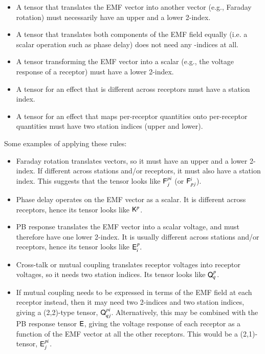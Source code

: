 \documentclass{aa}
\begin{document}
\begin{itemize}
\item A tensor that translates the EMF vector into another vector (e.g., Faraday rotation) must necessarily have an upper and a lower
2-index. 
\item A tensor that translates both components of the EMF field equally (i.e. a scalar operation such as phase delay) does not need any 
-indices at all.
\item A tensor transforming the EMF vector into a scalar (e.g., the voltage response of a receptor) must have a lower 2-index.
\item A tensor for an effect that is different across receptors must have a station index.
\item A tensor for an effect that maps per-receptor quantities onto per-receptor quantities must
have two station indices (upper and lower).
\end{itemize}

Some examples of applying these rules:

\begin{itemize}
\item Faraday rotation translates vectors, so it must have an upper and
a lower 2-index. If different across stations and/or receptors, it must also
have a station index. This suggests that the tensor looks like $\mathsf{F}_{j}^{pi}$ (or $\mathsf{F}_{pj}^{i}$).

\item Phase delay operates on the EMF vector as a scalar. It is different
across receptors, hence its tensor looks like $\mathsf{K}^{p}$.
\item PB response translates the EMF vector into a scalar voltage, and
must therefore have one lower 2-index. It is usually different across stations and/or receptors, hence its tensor looks 
like $\mathsf{E}_{i}^{p}.$
\item Cross-talk or mutual coupling translates receptor voltages into receptor voltages, so it needs two station indices. Its tensor looks
like $\mathsf{Q}_{q}^{p}$.
\item If mutual coupling needs to be expressed in terms of the EMF field at each receptor instead,
then it may need two 2-indices and two station indices, giving a (2,2)-type tensor, $\mathsf{Q}_{qj}^{pi}$.
Alternatively, this may be combined with the PB response tensor $\mathsf{E}$, giving the voltage response of each receptor as
a function of the EMF vector at all the other receptors. This would be a (2,1)-tensor, $\mathsf{E}_{j}^{pi}$.
\end{itemize}
\end{document}
